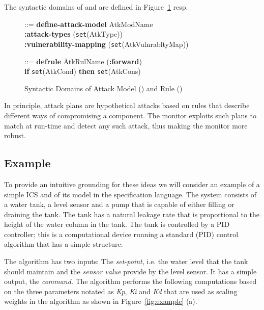 \documentclass[conference]{IEEEtran}
\begin{document}
The syntactic domains of  and  are defined in Figure~\ref{fig:attack} resp.

\begin{figure}
\begin{tabbing}
 ::= \textbf{define-}\=\textbf{attack-model} AtkModName
\\\> \textbf{:attack-types} \hspace*{1.5cm} (\texttt{set}(AtkType))
\\\> \textbf{:vulnerability-mapping} \hspace*{0.1cm} (\texttt{set}(AtkVulnrabltyMap))
\end{tabbing}

\begin{tabbing}
 ::= \textbf{defrule} \=AtkRulName (\textbf{:forward})
\\\> \textbf{if} \texttt{set}(AtkCond) \textbf{then} \texttt{set}(AtkCons)
\end{tabbing}
\caption{Syntactic Domains of Attack Model () and Rule ()}
\label{fig:attack}
\end{figure}

In principle, attack plans are hypothetical attacks based on rules that describe different ways of compromising a component. The monitor exploits such plans to match at run-time and detect any such attack, thus making the monitor more robust.

\subsection{Example}\label{subsec:example}
To provide an intuitive grounding for these ideas we will consider an example of a simple ICS and of its model in the specification language.  The system consists of a water tank, a level sensor and a pump that is capable of either filling or draining the tank. The tank has a natural leakage rate that is proportional to the height of the water column in the tank.
The tank is controlled by a PID controller; this is a computational device running a standard (PID) control algorithm that has a simple structure:

The algorithm has two  inputs: The {\em set-point}, i.e. the water level that the tank should maintain and the {\em sensor value} provide by the level sensor.  It has a simple output, the {\em command}.
The algorithm performs the following computations based on the three parameters notated as {\em Kp}, {\em Ki} and {\em Kd} that are used as scaling weights in the algorithm as shown in Figure~\ref{fig:example} (a).
\end{document}
